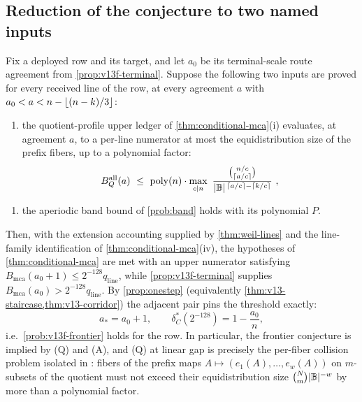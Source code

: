 \subsection{Reduction of the conjecture to two named inputs}

\begin{proposition}\label{prop:v13f-closing}
Fix a deployed row and its target, and let $a_0$ be its terminal-scale route agreement from \cref{prop:v13f-terminal}.  Suppose the following two inputs are proved for every received line of the row, at every agreement $a$ with $a_0<a<n-\left\lfloor (n-k)/3\right\rfloor$:
\begin{enumerate}[label=\textup{(Q)},leftmargin=2.6em]
\item the quotient-profile upper ledger of \cref{thm:conditional-mca}\textup{(i)} evaluates, at agreement $a$, to a per-line numerator at most the equidistribution size of the prefix fibers, up to a polynomial factor:
\[
        B_Q^{\mathrm{all}}(a)\ \le\ \mathrm{poly}(n)\cdot\max_{c\mid n}\ \frac{\binom{n/c}{\ceil{a/c}}}{|\B|^{\,\ceil{a/c}-\ceil{k/c}}}\ ,
\]
\end{enumerate}
\begin{enumerate}[label=\textup{(A)},leftmargin=2.6em]
\item the aperiodic band bound of \cref{prob:band} holds with its polynomial $P$.
\end{enumerate}
Then, with the extension accounting supplied by \cref{thm:weil-lines} and the line-family identification of \cref{thm:conditional-mca}\textup{(iv)}, the hypotheses of \cref{thm:conditional-mca} are met with an upper numerator satisfying $B_{\mathrm{mca}}(a_0+1)\le2^{-128}q_{\mathrm{line}}$, while \cref{prop:v13f-terminal} supplies $B_{\mathrm{mca}}(a_0)>2^{-128}q_{\mathrm{line}}$.  By \cref{prop:onestep} \textup(equivalently \cref{thm:v13-staircase,thm:v13-corridor}\textup) the adjacent pair pins the threshold exactly:
\[
        a_*=a_0+1,
        \qquad
        \delta^*_C(2^{-128})=1-\frac{a_0}{n},
\]
i.e.\ \cref{prob:v13f-frontier} holds for the row.  In particular, the frontier conjecture is implied by \textup{(Q)} and \textup{(A)}, and \textup{(Q)} at linear gap is precisely the per-fiber collision problem isolated in \cite{Cho26b}: fibers of the prefix maps $A\mapsto(e_1(A),\ldots,e_w(A))$ on $m$-subsets of the quotient must not exceed their equidistribution size $\binom Nm|\mathbb B|^{-w}$ by more than a polynomial factor.
\end{proposition}

